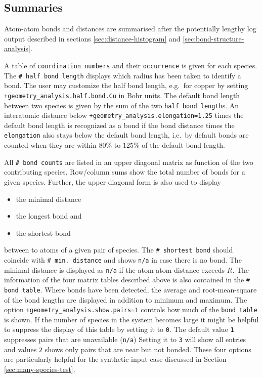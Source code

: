 \documentclass[oribibl]{llncs}
\newcommand{\ttt}[1]{\texttt{#1}}
\begin{document}
\subsection{Summaries}
%
Atom-atom bonds and distances are summarised after the potentially lengthy log output described in
sections \ref{sec:distance-histogram} and \ref{sec:bond-structure-analysis}.

\noindent
A table of \ttt{coordination numbers} and their \ttt{occurrence} is given for each species.
The \ttt{\# half bond length} displays which radius has been taken to identify a bond.
The user may customize the half bond length, e.g.~for copper 
by setting \ttt{+geometry\_analysis.half.bond.Cu} in Bohr units.
The default bond length between two species is given by the sum of
the two \ttt{half bond length}s.
An interatomic distance below \ttt{+geometry\_analysis.elongation=1.25} 
times the default bond length is recognized as a bond
if the bond distance times the \ttt{elongation} also stays below the default bond length,
i.e.~by default bonds are counted when they are within $80\%$ to $125\%$ of the default bond length.
%

\noindent
All \ttt{\# bond counts} are listed in an upper diagonal matrix as function of the two
contributing species. Row/column sums show the total number of bonds for a given species.
Further, the upper diagonal form is also used to display
\begin{itemize}
	\item the minimal distance
	\item the longest bond and
	\item the shortest bond
\end{itemize}
between to atoms of a given pair of species.
The \ttt{\# shortest bond} should coincide with \ttt{\# min. distance}
and shows \ttt{n/a} in case there is no bond.
The minimal distance is displayed as \ttt{n/a} if the atom-atom distance exceeds $R$.
%
The information of the four matrix tables described above
is also contained in the \ttt{\# bond table}.
Where bonds have been detected, 
the average and root-mean-square of the bond lengths are displayed
in addition to minimum and maximum.
The option \ttt{+geometry\_analysis.show.pairs=1} controls how much of the \ttt{bond table} is shown.
If the number of species in the system becomes large it might be helpful
to suppress the display of this table by setting it to \ttt{0}.
The default value \ttt{1} suppresses pairs that are unavailable (\ttt{n/a})
Setting it to \ttt{3} will show all entries and values \ttt{2} shows only
pairs that are near but not bonded.
These four options are particularly helpful for the synthetic input case discussed in Section \ref{sec:many-species-test}.
\end{document}
